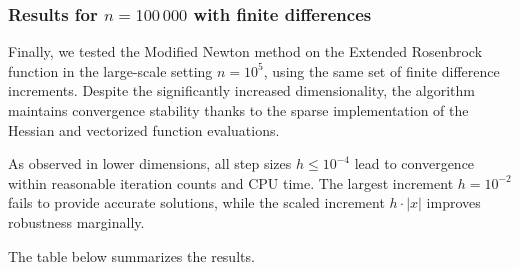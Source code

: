 \documentclass[a4paper,12pt]{article}
\begin{document}
	\subsubsection*{Results for $n = 100\,000$ with finite differences}
	
	Finally, we tested the Modified Newton method on the Extended Rosenbrock function in the large-scale setting \( n = 10^5 \), using the same set of finite difference increments. Despite the significantly increased dimensionality, the algorithm maintains convergence stability thanks to the sparse implementation of the Hessian and vectorized function evaluations.
	
	As observed in lower dimensions, all step sizes \( h \leq 10^{-4} \) lead to convergence within reasonable iteration counts and CPU time. The largest increment \( h = 10^{-2} \) fails to provide accurate solutions, while the scaled increment \( h \cdot |x| \) improves robustness marginally.
	
	The table below summarizes the results.
	
	\vspace{1em}
	
\end{document}
